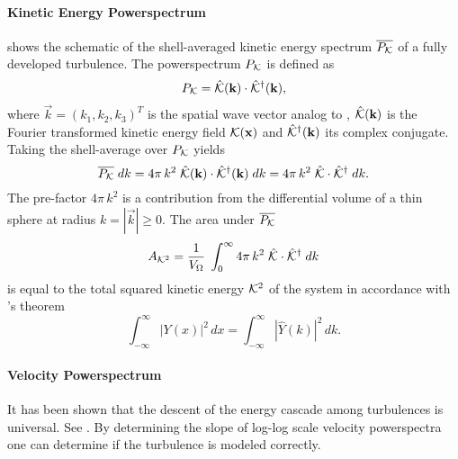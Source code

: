 \paragraph{Kinetic Energy Powerspectrum}
\newcommand{\pekin}{P_{\ekin}}
 shows the schematic of the shell-averaged
kinetic energy spectrum $\overline{\pekin}$ of a fully developed
turbulence. The powerspectrum $\pekin$ is defined as
\begin{equation}
    \pekin = \hat{\ekin}(\vec{k}) \cdot \hat{\ekin}^{\dagger}(\vec{k}),
\end{equation}
where $\vec{k} = (k_1,k_2,k_3)^T$  is the spatial wave vector analog to
, $\hat{\mathcal{K}}(\mathbf{k})$ is the Fourier transformed kinetic
energy field $\mathcal{K}(\mathbf{x})$ and $\hat{\mathcal{K}}^{\dagger}(\mathbf{k})$ its complex
conjugate. Taking the shell-average over $\pekin$ yields
\begin{equation}
\label{eqn:pws-ekin}
    \overline{\pekin} \; dk = 4\pi\,k^2 \; \hat{\ekin}(\vec{k}) \cdot \hat{\ekin}^{\dagger}(\vec{k}) \; dk
        = 4\pi\,k^2 \; \hat{\ekin} \cdot \hat{\ekin}^{\dagger} \; dk
.
\end{equation}
The pre-factor $4 \pi\,k^2$ is a contribution from the differential volume of a
thin sphere at radius $k = |\vec{k}| \ge 0$.  The area under
$\overline{\pekin}$
\begin{equation}
    A_{\mathcal{K}^2} = \frac{1}{V_{\Omega}} \; \int_0^\infty 4\pi\,k^2 \; \hat{\mathcal{K}} \cdot \hat{\mathcal{K}}^{\dagger} \; dk
\end{equation}
is equal to the total squared kinetic energy $\mathcal{K}^2$ of the system in
accordance with 's theorem
\begin{equation}
    \int_{-\infty}^{\infty} |Y(x)|^2 \, dx = \int_{-\infty}^{\infty} |\hat{Y}(k)|^2 \,dk.
\end{equation}

\paragraph{Velocity Powerspectrum}
\label{sec:theory-powerspectrum}
\newcommand{\pvels}{P_{\vels}}
\newcommand{\pmvels}{P_{m\vels}}
It has been shown that the descent of the energy cascade among turbulences is
universal. See
\cite{federrath2013universality,she1994universal,boldyrev2002scaling,kitsionas2009algorithmic}.
By determining the slope of log-log scale velocity powerspectra one can
determine if the turbulence is modeled correctly.

